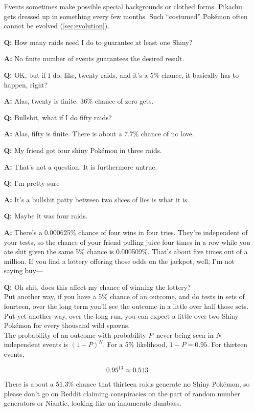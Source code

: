 Events sometimes make possible special backgrounds or clothed forms.
Pikachu gets dressed up in something every few months.
Such ``costumed'' Pokémon often cannot be evolved (\autoref{sec:evolution}).

\vfill
\begin{tipbox}[title=An aside regarding independent events,title style={color=Green!50!black}]
\textbf{Q:} How many raids need I do to guarantee at least one Shiny?

\textbf{A:} No finite number of events guarantees the desired result.

\textbf{Q:} OK, but if I do, like, twenty raids, and it's a 5\% chance, it basically has to happen, right?

\textbf{A:} Alas, twenty is finite. 36\% chance of zero gets.

\textbf{Q:} Bullshit, what if I do fifty raids?

\textbf{A:} Alas, fifty is finite. There is about a 7.7\% chance of no love.

\textbf{Q:} My friend got four shiny Pokémon in three raids.

\textbf{A:} That's not a question. It is furthermore untrue.

\textbf{Q:} I'm pretty sure---

\textbf{A:} It's a bullshit patty between two slices of lies is what it is.

\textbf{Q:} Maybe it was four raids.

\textbf{A:} There's a 0.000625\% chance of four wins in four tries. They're independent of your tests,
             so the chance of your friend pulling juice four times in a row while you ate shit given
             the same 5\% chance is 0.000509\%. That's about five times out of a million.
             If you find a lottery offering those odds on the jackpot, well, I'm not saying buy---

\textbf{Q:} Oh shit, does this affect my chance of winning the lottery?\\

Put another way, if you have a 5\% chance of an outcome, and do tests in sets of fourteen,
 over the long term you'll see the outcome in a little over half those sets.
Put yet another way, over the long run, you can expect a little over two Shiny
 Pokémon for every thousand wild spawns.\\

The probability of an outcome with probability $P$\, never being seen in $N$ independent
  events is ${(1 - P)}^N$. For a 5\% likelihood, $1 - P = 0.95$. For thirteen events,

  \[ 0.95^{13} ≈ 0.513 \]

There is about a 51.3\% chance that thirteen raids generate no Shiny Pokémon,
  so please don't go on Reddit claiming conspiracies on the part of
  random number generators or Niantic, looking like an innumerate dumbass.
\end{tipbox}
